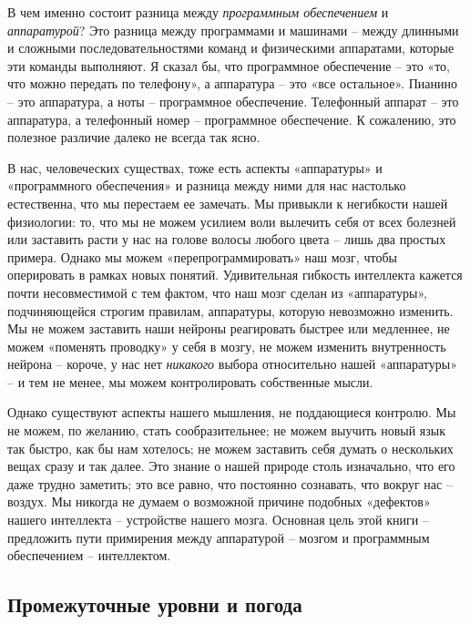 \documentclass[../main.tex]{subfiles}
\begin{document}
В чем именно состоит разница между \emph{программным обеспечением} и \emph{аппаратурой}? Это разница между программами и машинами \--- между длинными и сложными последовательностями команд и физическими аппаратами, которые эти команды выполняют. Я сказал бы, что программное обеспечение \--- это «то, что можно передать по телефону», а аппаратура \--- это «все остальное». Пианино \--- это аппаратура, а ноты \--- программное обеспечение. Телефонный аппарат \--- это аппаратура, а телефонный номер \--- программное обеспечение. К сожалению, это полезное различие далеко не всегда так ясно.

В нас, человеческих существах, тоже есть аспекты «аппаратуры» и «программного обеспечения» и разница между ними для нас настолько естественна, что мы перестаем ее замечать. Мы привыкли к негибкости нашей физиологии: то, что мы не можем усилием воли вылечить себя от всех болезней или заставить расти у нас на голове волосы любого цвета \--- лишь два простых примера. Однако мы можем «перепрограммировать» наш мозг, чтобы оперировать в рамках новых понятий. Удивительная гибкость интеллекта кажется почти несовместимой с тем фактом, что наш мозг сделан из «аппаратуры», подчиняющейся строгим правилам, аппаратуры, которую невозможно изменить. Мы не можем заставить наши нейроны реагировать быстрее или медленнее, не можем «поменять проводку» у себя в мозгу, не можем изменить внутренность нейрона \--- короче, у нас нет \emph{никакого} выбора относительно нашей «аппаратуры» \--- и тем не менее, мы можем контролировать собственные мысли.

Однако существуют аспекты нашего мышления, не поддающиеся контролю. Мы не можем, по желанию, стать сообразительнее; не можем выучить новый язык так быстро, как бы нам хотелось; не можем заставить себя думать о нескольких вещах сразу и так далее. Это знание о нашей природе столь изначально, что его даже трудно заметить; это все равно, что постоянно сознавать, что вокруг нас \--- воздух. Мы никогда не думаем о возможной причине подобных «дефектов» нашего интеллекта \--- устройстве нашего мозга. Основная цель этой книги \--- предложить пути примирения между аппаратурой \--- мозгом и программным обеспечением \--- интеллектом.


\subsection{Промежуточные уровни и погода}
\end{document}
